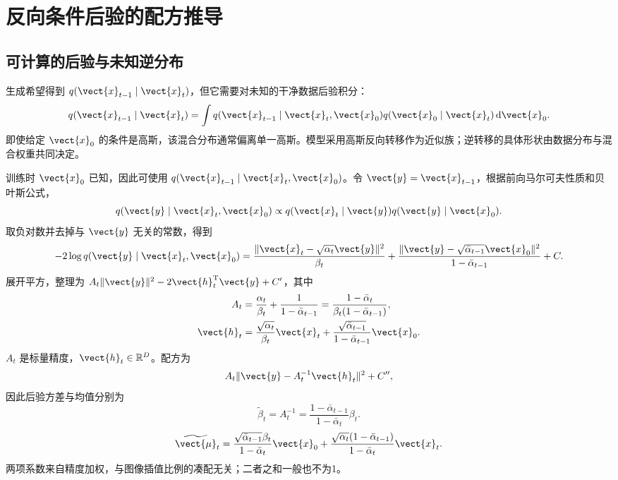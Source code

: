 \documentclass[../textbook.tex]{subfiles}
\begin{document}
\section{反向条件后验的配方推导}

\subsection{可计算的后验与未知逆分布}
生成希望得到 $q(\vect{x}_{t-1}\mid \vect{x}_t)$，但它需要对未知的干净数据后验积分：
\begin{equation}
 q(\vect{x}_{t-1}\mid \vect{x}_t)=\int q(\vect{x}_{t-1}\mid \vect{x}_t,\vect{x}_0)q(\vect{x}_0\mid \vect{x}_t)\,\mathrm d\vect{x}_0.
\end{equation}
即使给定 $\vect{x}_0$ 的条件是高斯，该混合分布通常偏离单一高斯。模型采用高斯反向转移作为近似族；逆转移的具体形状由数据分布与混合权重共同决定。

训练时 $\vect{x}_0$ 已知，因此可使用 $q(\vect{x}_{t-1}\mid \vect{x}_t,\vect{x}_0)$。令 $\vect{y}=\vect{x}_{t-1}$，根据前向马尔可夫性质和贝叶斯公式，
\begin{equation}
 q(\vect{y}\mid \vect{x}_t,\vect{x}_0)\propto q(\vect{x}_t\mid \vect{y})q(\vect{y}\mid \vect{x}_0).
\end{equation}
取负对数并去掉与 $\vect{y}$ 无关的常数，得到
\begin{equation}
 -2\log q(\vect{y}\mid \vect{x}_t,\vect{x}_0)=\frac{\|\vect{x}_t-\sqrt{\alpha_t}\vect{y}\|^2}{\beta_t}
 +\frac{\|\vect{y}-\sqrt{\bar\alpha_{t-1}}\vect{x}_0\|^2}{1-\bar\alpha_{t-1}}+C.
\end{equation}
展开平方，整理为 $A_t\|\vect{y}\|^2-2\vect{h}_t^{\mathrm{T}}\vect{y}+C'$，其中
\begin{align}
 A_t&=\frac{\alpha_t}{\beta_t}+\frac1{1-\bar\alpha_{t-1}}
 =\frac{1-\bar\alpha_t}{\beta_t(1-\bar\alpha_{t-1})},\\
 \vect{h}_t&=\frac{\sqrt{\alpha_t}}{\beta_t}\vect{x}_t+
 \frac{\sqrt{\bar\alpha_{t-1}}}{1-\bar\alpha_{t-1}}\vect{x}_0.
\end{align}
$A_t$ 是标量精度，$\vect{h}_t\in\mathbb R^D$。配方为
\begin{equation}
 A_t\|\vect{y}-A_t^{-1}\vect{h}_t\|^2+C'',
\end{equation}
因此后验方差与均值分别为
\begin{equation}
 \widetilde\beta_t=A_t^{-1}=\frac{1-\bar\alpha_{t-1}}{1-\bar\alpha_t}\beta_t.
 \label{eq:diff-postvar}
\end{equation}
\begin{equation}
 \widetilde{\vect{\mu}}_t=\frac{\sqrt{\bar\alpha_{t-1}}\beta_t}{1-\bar\alpha_t}\vect{x}_0+
 \frac{\sqrt{\alpha_t}(1-\bar\alpha_{t-1})}{1-\bar\alpha_t}\vect{x}_t.
 \label{eq:diff-postmean}
\end{equation}
两项系数来自精度加权，与图像插值比例的凑配无关；二者之和一般也不为1。
\end{document}

